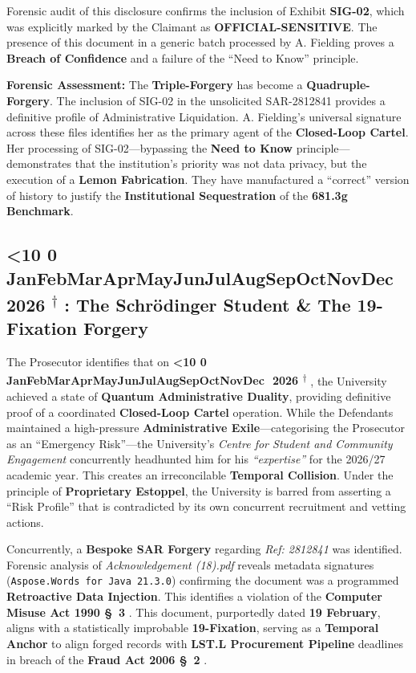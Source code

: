 \documentclass{EMBASSY}
\DeclareRobustCommand{\gmt}[3]{%
    \texorpdfstring{%
        {\color{DateGold}\textbf{%
            \ifnum#1<10 0\fi#1\,\textperiodcentered\,%
            \ifcase#2\or Jan\or Feb\or Mar\or Apr\or May\or Jun\or Jul\or Aug\or Sep\or Oct\or Nov\or Dec\fi
            \,\textperiodcentered\,20#3%
            \textsuperscript{$\dagger$}%
        }}%
    }{%
        (#1/#2/#3)%
    }%
}
\begin{document}
Forensic audit of this disclosure confirms the inclusion of Exhibit \textbf{SIG-02}, which was explicitly marked by the Claimant as \textbf{OFFICIAL-SENSITIVE}. The presence of this document in a generic batch processed by A. Fielding proves a \textbf{Breach of Confidence} and a failure of the ``Need to Know'' principle.

\textbf{Forensic Assessment:} The \textbf{Triple-Forgery} has become a \textbf{Quadruple-Forgery}. The inclusion of SIG-02 in the unsolicited SAR-2812841 provides a definitive profile of Administrative Liquidation. A. Fielding’s universal signature across these files identifies her as the primary agent of the \textbf{Closed-Loop Cartel}. Her processing of SIG-02---bypassing the \textbf{Need to Know} principle---demonstrates that the institution’s priority was not data privacy, but the execution of a \textbf{Lemon Fabrication}. They have manufactured a ``correct'' version of history to justify the \textbf{Institutional Sequestration} of the \textbf{681.3g Benchmark}.

\subsection{\gmt{18}{3}{26}: The Schr\"odinger Student \& The 19-Fixation Forgery}
The Prosecutor identifies that on \gmt{18}{3}{26}, the University achieved a state of \textbf{Quantum Administrative Duality}, providing definitive proof of a coordinated \textbf{Closed-Loop Cartel} operation. While the Defendants maintained a high-pressure \textbf{Administrative Exile}---categorising the Prosecutor as an ``Emergency Risk''---the University’s \textit{Centre for Student and Community Engagement} concurrently headhunted him for his \textit{``expertise''} for the 2026/27 academic year. This creates an irreconcilable \textbf{Temporal Collision}. Under the principle of \textbf{Proprietary Estoppel}, the University is barred from asserting a ``Risk Profile'' that is contradicted by its own concurrent recruitment and vetting actions.

Concurrently, a \textbf{Bespoke SAR Forgery} regarding \textit{Ref: 2812841} was identified. Forensic analysis of \textit{Acknowledgement (18).pdf} reveals metadata signatures (\texttt{Aspose.Words for Java 21.3.0}) confirming the document was a programmed \textbf{Retroactive Data Injection}. This identifies a violation of the \textbf{Computer Misuse Act 1990 \S~3} \cite{CMA90}. This document, purportedly dated \textbf{19 February}, aligns with a statistically improbable \textbf{19-Fixation}, serving as a \textbf{Temporal Anchor} to align forged records with \textbf{LST.L Procurement Pipeline} deadlines in breach of the \textbf{Fraud Act 2006 \S~2} \cite{FraudAct06}.
\end{document}
